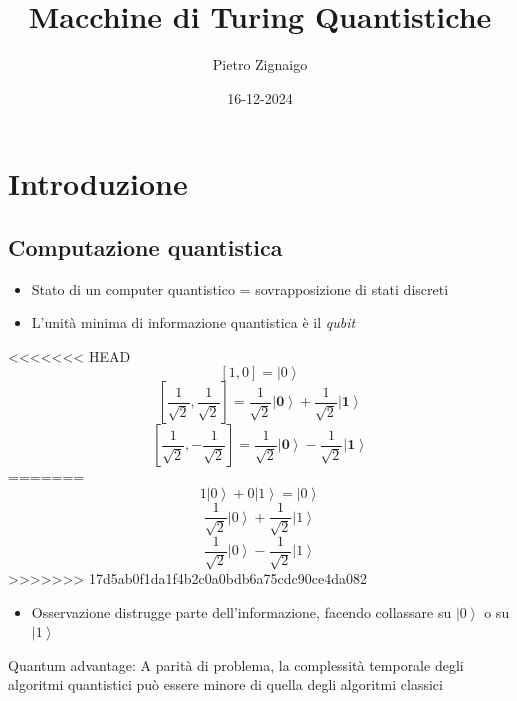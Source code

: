 \documentclass{beamer}
\title
{Macchine di Turing Quantistiche}
\author
{Pietro Zignaigo}
\institute
{Università di Genova}
\date
{16-12-2024}
\newcommand{\Zero}{\mathbf{0}}
\newcommand{\One}{\mathbf{1}}
\begin{document}
\begin{frame}
	\titlepage
\end{frame}

\begin{frame}
	\tableofcontents
\end{frame}

\section{Introduzione}

\subsection{Computazione quantistica}

\begin{frame}{\subsecname}{}
	\begin{itemize}
		\item Stato di un computer quantistico = sovrapposizione di stati discreti
		\pause \item L'unità minima di informazione quantistica è il \textit{qubit}
	\end{itemize}
<<<<<<< HEAD
	\[ \left [ 1 , 0 \right ] = \left | 0 \right \rangle \]
	\[ 
	\left [ \frac{1}{\sqrt{2}} , \frac{1}{\sqrt{2}} \right ] = 
	\frac{1}{\sqrt{2}} \left | \Zero \right \rangle + \frac{1}{\sqrt{2}} \left | \One \right \rangle \]
	\[ \left [ \frac{1}{\sqrt{2}} , -\frac{1}{\sqrt{2}} \right ] = 
	\frac{1}{\sqrt{2}} \left | \Zero \right \rangle - \frac{1}{\sqrt{2}} \left | \One \right \rangle \]
=======
	\[ 1 \left | 0 \right \rangle + 0 \left | 1 \right \rangle = \left | 0 \right \rangle \]
	\[ \frac{1}{\sqrt{2}} \left | 0 \right \rangle + \frac{1}{\sqrt{2}} \left | 1 \right \rangle \]
	\[ \frac{1}{\sqrt{2}} \left | 0 \right \rangle - \frac{1}{\sqrt{2}} \left | 1 \right \rangle \]
>>>>>>> 17d5ab0f1da1f4b2c0a0bdb6a75cdc90ce4da082
	\begin{itemize}
		\pause \item Osservazione distrugge parte dell'informazione, facendo collassare su \( \left | 0 \right \rangle \) o su \( \left | 1 \right \rangle \)
	\end{itemize}
\end{frame}

\begin{frame}{\subsecname}{}
	Quantum advantage: A parità di problema, la complessità temporale degli algoritmi quantistici può essere minore di quella degli algoritmi classici
\end{frame}
\end{document}
